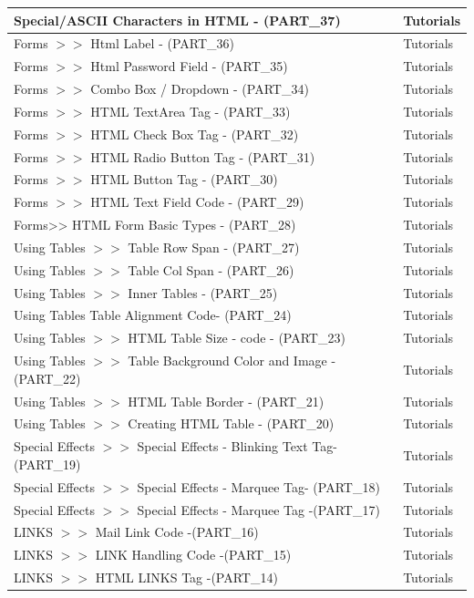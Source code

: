 \documentclass[a4paper, 11pt]{article}
\begin{document}
\begin{longtable}{ |p{12cm}|p{2cm}| }
\hline
Special/ASCII Characters in HTML - (PART\_37)
&
Tutorials \\
\hline
Forms $>>$  Html Label  - (PART\_36)
&
Tutorials \\
\hline
Forms $>>$ Html Password Field - (PART\_35)
&
Tutorials \\
\hline
Forms $>>$ Combo Box / Dropdown  - (PART\_34)
&
Tutorials \\
\hline
Forms $>>$ HTML TextArea Tag  - (PART\_33)
&
Tutorials \\
\hline
Forms $>>$ HTML Check Box Tag  - (PART\_32)
&
Tutorials \\
\hline
Forms $>>$ HTML Radio Button Tag  - (PART\_31)
&
Tutorials \\
\hline
Forms $>>$ HTML Button Tag - (PART\_30)
&
Tutorials \\
\hline
Forms $>>$ HTML Text Field Code - (PART\_29)
&
Tutorials \\
\hline
Forms>>  HTML Form Basic Types  - (PART\_28)
&
Tutorials \\
\hline
Using Tables $>>$ Table Row Span  - (PART\_27)
&
Tutorials \\
\hline
Using Tables $>>$ Table Col Span - (PART\_26)
&
Tutorials \\
\hline
Using Tables $>>$ Inner Tables - (PART\_25)
&
Tutorials \\
\hline
Using Tables    Table Alignment Code- (PART\_24)
&
Tutorials \\
\hline
Using Tables  $>>$ HTML Table Size - code  - (PART\_23)
&
Tutorials \\
\hline
Using Tables $>>$ Table Background Color and Image - (PART\_22)
&
Tutorials \\
\hline
Using Tables $>>$ HTML Table Border - (PART\_21)
&
Tutorials \\
\hline
Using Tables $>>$ Creating HTML Table - (PART\_20)
&
Tutorials \\
\hline
Special Effects $>>$ Special Effects - Blinking Text Tag- (PART\_19)
&
Tutorials \\
\hline
Special Effects $>>$ Special Effects - Marquee Tag- (PART\_18)
&
Tutorials \\
\hline
Special Effects $>>$ Special Effects - Marquee Tag -(PART\_17)
&
Tutorials \\
\hline
LINKS $>>$ Mail Link Code -(PART\_16)
&
Tutorials \\
\hline
LINKS $>>$ LINK Handling Code  -(PART\_15)
&
Tutorials \\
\hline
LINKS  $>>$   HTML LINKS Tag  -(PART\_14)
&
Tutorials \\
\hline
\end{longtable}
\end{document}
